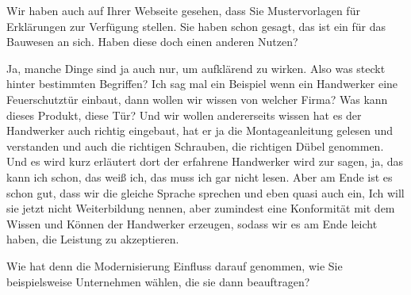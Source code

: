\begin{description}
\Fabian Wir haben auch auf Ihrer Webseite gesehen, dass Sie Mustervorlagen für Erklärungen zur Verfügung stellen. Sie haben schon gesagt, das ist ein für das Bauwesen an sich. Haben diese doch einen anderen Nutzen?

\Andre Ja, manche Dinge sind ja auch nur, um aufklärend zu wirken. Also was steckt hinter bestimmten Begriffen? Ich sag mal ein Beispiel wenn ein Handwerker eine Feuerschutztür einbaut, dann wollen wir wissen von welcher Firma? Was kann dieses Produkt, diese Tür? Und wir wollen andererseits wissen hat es der Handwerker auch richtig eingebaut, hat er ja die Montageanleitung gelesen und verstanden und auch die richtigen Schrauben, die richtigen Dübel genommen. Und es wird kurz erläutert dort der erfahrene Handwerker wird zur sagen, ja, das kann ich schon, das weiß ich, das muss ich gar nicht lesen. Aber am Ende ist es schon gut, dass wir die gleiche Sprache sprechen und eben quasi auch ein, Ich will sie jetzt nicht Weiterbildung nennen, aber zumindest eine Konformität mit dem Wissen und Können der Handwerker erzeugen, sodass wir es am Ende leicht haben, die Leistung zu akzeptieren.

\Toni Wie hat denn die Modernisierung Einfluss darauf genommen, wie Sie beispielsweise Unternehmen wählen, die sie dann beauftragen?


\end{description}
